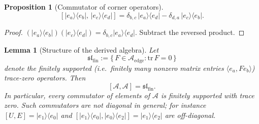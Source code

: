 \documentclass[10pt]{amsart}
\newcommand{\1}{{\mathbb{I}}}
\newtheorem{prop}[theorem]{Proposition}
\newtheorem{lemma}[theorem]{Lemma}
\numberwithin{equation}{section}
\begin{document}
\begin{prop}[Commutator of corner operators]\label{prop:corner-corner}
\[
[|e_a\rangle\langle e_b|,\, |e_c\rangle\langle e_d|]
= \delta_{b,c}\, |e_a\rangle\langle e_d| - \delta_{d,a}\, |e_c\rangle\langle e_b|.
\]
\end{prop}
\begin{proof}
$(|e_a\rangle\langle e_b|)(|e_c\rangle\langle e_d|) = \delta_{b,c}|e_a\rangle\langle e_d|$.
Subtract the reversed product.
\end{proof}

\begin{lemma}[Structure of the derived algebra]\label{lem:commutators-diagonal}
Let
\[
\mathfrak{sl}_{\mathrm{fin}} := \bigl\{\, F \in \mathcal{A}_{\mathrm{edge}}
: \mathrm{tr}\,F = 0 \,\bigr\}
\]
denote the finitely supported (i.e.\ finitely many nonzero matrix entries
$\langle e_a,Fe_b\rangle$) trace-zero operators. Then
\[
[\mathcal{A},\mathcal{A}] = \mathfrak{sl}_{\mathrm{fin}}.
\]
In particular, every commutator of elements of $\mathcal{A}$ is finitely supported with trace
zero. Such commutators are \emph{not} diagonal in general; for instance
$[U,E]=|e_1\rangle\langle e_0|$ and
$[|e_1\rangle\langle e_0|,|e_0\rangle\langle e_2|]=|e_1\rangle\langle e_2|$ are off-diagonal.
\end{lemma}
\end{document}
